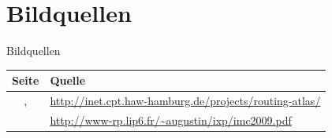 \documentclass[ngerman,compress,hyperref={bookmarks}]{beamer}
\begin{document}
\section{Bildquellen}
\begin{frame}[plain]{Bildquellen}
  \scriptsize
  \begin{table}
    \begin{tabular}{ c p{} }
      Seite & Quelle \\ \hline
      \pageref{asgraphs}, \pageref{asngraphs2} & \url{http://inet.cpt.haw-hamburg.de/projects/routing-atlas/}\\ \hline
      \pageref{augustin_ixp} & \url{http://www-rp.lip6.fr/~augustin/ixp/imc2009.pdf} \\ \hline
    \end{tabular}
  \end{table}
\end{frame}
\end{document}
